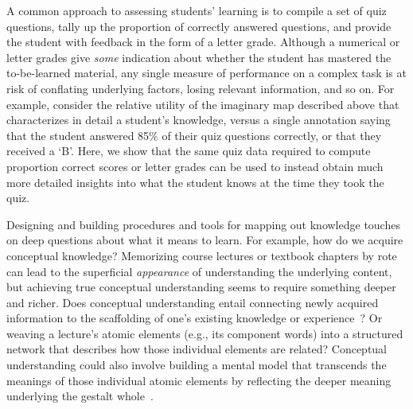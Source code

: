 \documentclass[10pt]{article}
\begin{document}
A common approach to assessing students' learning is to compile a set of quiz
questions, tally up the proportion of correctly answered questions, and provide
the student with feedback in the form of a letter grade. Although a numerical
or letter grades give \textit{some} indication about whether the student has
mastered the to-be-learned material, any single measure of performance on a
complex task is at risk of conflating underlying factors, losing relevant
information, and so on. For example, consider the relative utility of the
imaginary map described above that characterizes in detail a student's
knowledge, versus a single annotation saying that the student answered 85\% of
their quiz questions correctly, or that they received a `B'. Here, we show that
the same quiz data required to compute proportion correct scores or letter
grades can be used to instead obtain much more detailed insights into what the
student knows at the time they took the quiz.

Designing and building procedures and tools for mapping out knowledge touches
on deep questions about what it means to learn. For example, how do we acquire
conceptual knowledge? Memorizing course lectures or textbook chapters by rote
can lead to the superficial \textit{appearance} of understanding the underlying
content, but achieving true conceptual understanding seems to require something
deeper and richer. Does conceptual understanding entail connecting newly
acquired information to the scaffolding of one's existing knowledge or
experience~\citep{BlayEtal06,CaraMaho03, ConsEtal16, DeacEtal04, SimoEtal04}?
Or weaving a lecture's atomic elements (e.g., its component words) into a
structured network that describes how those individual elements are related?
Conceptual understanding could also involve building a mental model that
transcends the meanings of those individual atomic elements by reflecting the
deeper meaning underlying the gestalt whole~\citep{Kint70, Macl05, ScotEtal07}.
\end{document}
